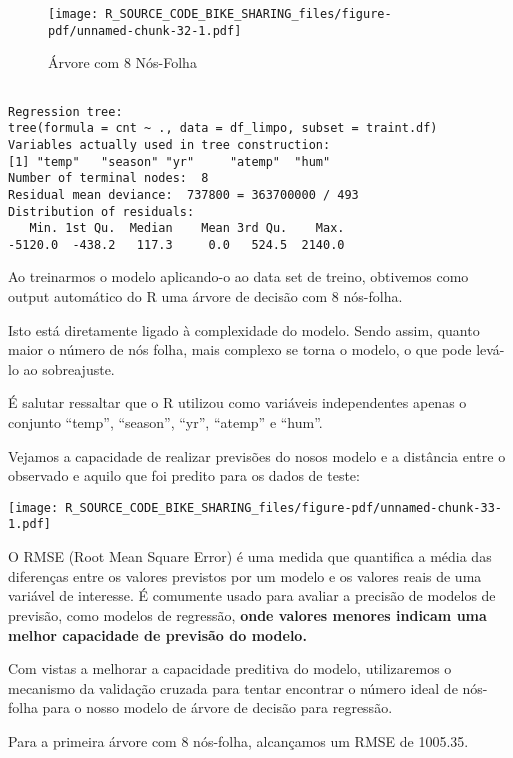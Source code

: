 \documentclass[
  letterpaper,
  DIV=11,
  numbers=noendperiod]{scrartcl}
\begin{document}
\begin{figure}[H]

{\centering \texttt{[image: R\_SOURCE\_CODE\_BIKE\_SHARING\_files/figure-pdf/unnamed-chunk-32-1.pdf]}

}

\caption{Árvore com 8 Nós-Folha}

\end{figure}%

\begin{verbatim}

Regression tree:
tree(formula = cnt ~ ., data = df_limpo, subset = traint.df)
Variables actually used in tree construction:
[1] "temp"   "season" "yr"     "atemp"  "hum"   
Number of terminal nodes:  8 
Residual mean deviance:  737800 = 363700000 / 493 
Distribution of residuals:
   Min. 1st Qu.  Median    Mean 3rd Qu.    Max. 
-5120.0  -438.2   117.3     0.0   524.5  2140.0 
\end{verbatim}

Ao treinarmos o modelo aplicando-o ao data set de treino, obtivemos como
output automático do R uma árvore de decisão com 8 nós-folha.

Isto está diretamente ligado à complexidade do modelo. Sendo assim,
quanto maior o número de nós folha, mais complexo se torna o modelo, o
que pode levá-lo ao sobreajuste.

É salutar ressaltar que o R utilizou como variáveis independentes apenas
o conjunto ``temp'', ``season'', ``yr'', ``atemp'' e ``hum''.

Vejamos a capacidade de realizar previsões do nosos modelo e a distância
entre o observado e aquilo que foi predito para os dados de teste:

\texttt{[image: R\_SOURCE\_CODE\_BIKE\_SHARING\_files/figure-pdf/unnamed-chunk-33-1.pdf]}

O RMSE (Root Mean Square Error) é uma medida que quantifica a média das
diferenças entre os valores previstos por um modelo e os valores reais
de uma variável de interesse. É comumente usado para avaliar a precisão
de modelos de previsão, como modelos de regressão, \textbf{onde valores
menores indicam uma melhor capacidade de previsão do modelo.}

Com vistas a melhorar a capacidade preditiva do modelo, utilizaremos o
mecanismo da validação cruzada para tentar encontrar o número ideal de
nós-folha para o nosso modelo de árvore de decisão para regressão.

Para a primeira árvore com 8 nós-folha, alcançamos um RMSE de 1005.35.
\end{document}

